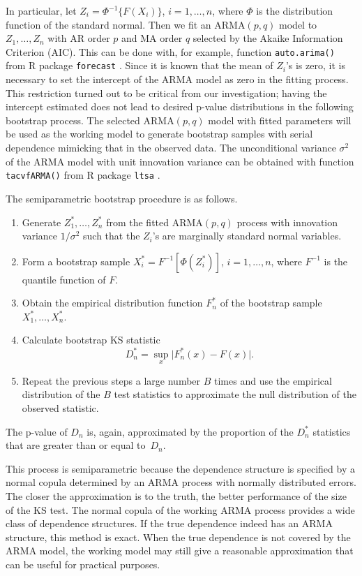 \documentclass[12pt, letterpaper]{article}
\begin{document}
In particular, let
$Z_i = \Phi^{-1}\{ F(X_i)\}$, $i = 1, \ldots, n$, where $\Phi$ is the distribution
function of the standard normal. Then we fit an ARMA$(p, q)$ model to
$Z_1, \ldots, Z_n$ with AR order $p$ and MA order $q$ selected by the Akaike
Information Criterion (AIC). This can be done with, for example, function
\texttt{auto.arima()} from  R package \texttt{forecast}
\citep{hyndman2008automatic}. Since it is known that the mean of $Z_i$'s is
zero, it is necessary to set the intercept of the ARMA model as zero in the
fitting process. This restriction turned out to be critical from our
investigation; having the intercept estimated does not lead to desired p-value
distributions in the following bootstrap process.
The selected ARMA$(p, q)$ model with fitted
parameters will be used as the working model to generate bootstrap samples with
serial dependence mimicking that in the observed data. The unconditional
variance $\sigma^2$ of the ARMA model with unit innovation variance can be
obtained with function
\texttt{tacvfARMA()} from R package \texttt{ltsa} \citep{mcleod2007algorithms}.


The semiparametric bootstrap procedure is as follows.
\begin{enumerate}
\item
  Generate $Z_1^*, \ldots, Z_n^*$ from the fitted ARMA$(p, q)$ process with
  innovation variance $1 / \sigma^2$ such that the $Z_i$'s are
	marginally standard normal variables.
\item
  Form a bootstrap sample $X_i^* = F^{-1} [\Phi(Z_i^*)]$,  $i = 1, \ldots, n$,
  where $F^{-1}$ is the quantile function of $F$.
\item
  Obtain the empirical distribution function $F_n^*$ of the bootstrap sample
  $X_1^*, \ldots, X_n^*$.
\item
  Calculate bootstrap KS statistic
  \[
    D_n^* = \sup_x \lvert F_n^* (x)- F(x) \rvert.
  \]
\item
  Repeat the previous steps a large number $B$ times and use the empirical
  distribution of the $B$ test statistics to approximate
  the null distribution of the observed statistic.
\end{enumerate}
The p-value of $D_n$ is, again, approximated by the proportion of the $D_n^*$
statistics that are greater than or equal to~$D_n$. 


This process is semiparametric because the dependence structure is specified by
a normal copula determined by an ARMA process with normally distributed errors.
The closer the approximation is to the truth, the better
performance of the size of the KS test. The normal copula of the working ARMA
process provides a wide class of dependence structures.
If the true dependence indeed has an ARMA structure, this method is exact. When
the true dependence is not covered by the ARMA model, the working model may 
still give a reasonable approximation that can
be useful for practical purposes. 
\end{document}
